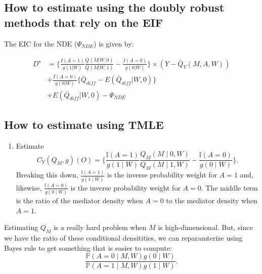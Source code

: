 \documentclass[
  12pt, krantz2,
]{book}
\providecommand{\tightlist}{%
  \setlength{\itemsep}{0pt}\setlength{\parskip}{0pt}}
\theoremstyle{definition}
\theoremstyle{definition}
\theoremstyle{definition}
\renewcommand{\P}{\mathbb{P}}
\newcommand{\I}{\mathbb{I}}
\newcommand{\1}{\mathbbm{1}}
\begin{document}
\hypertarget{how-to-estimate-using-the-doubly-robust-methods-that-rely-on-the-eif}{%
\subsection{How to estimate using the doubly robust methods that rely on the EIF}\label{how-to-estimate-using-the-doubly-robust-methods-that-rely-on-the-eif}}

The EIC for the NDE (\(\Psi_{NDE}\)) is given by:

\begin{align}
    D^{\star} &= \bigg\{ \frac{I(A=1)}{g(1|W)}\frac{Q(M|W,0)}{Q(M|W,1)} -
      \frac{I(A=0)}{g(0|W)}\bigg\} \times (Y-\bar{Q}_Y(M,A,W))  \\
    &+ \frac{I(A=0)}{g(0|W)}\{ \bar{Q}_{diff} - E(\bar{Q}_{diff} | W,0) \}\\
    &+ E(\bar{Q}_{diff} | W,0) - \Psi_{NDE}
\end{align}

\hypertarget{how-to-estimate-using-tmle}{%
\subsection{How to estimate using TMLE}\label{how-to-estimate-using-tmle}}

\begin{enumerate}
\def\labelenumi{\arabic{enumi}.}
\tightlist
\item
  Estimate
  \begin{equation*}
   C_Y(Q_M, g)(O) = \Bigg\{\frac{\I(A = 1)}{g(1 \mid W)}
     \frac{Q_M(M \mid 0, W)}{Q_M(M \mid 1, W)} -
     \frac{\I(A = 0)}{g(0 \mid W)} \Bigg\}.
    \end{equation*}
  Breaking this down, \(\frac{\I(A = 1)}{g(1 \mid W)}\) is the inverse probability
  weight for \(A = 1\) and, likewise, \(\frac{\I(A = 0)}{g(0 \mid W)}\) is the inverse
  probability weight for \(A = 0\). The middle term is the ratio of the mediator
  density when \(A = 0\) to the mediator density when \(A = 1\).
\end{enumerate}

Estimating \(Q_M\) is a really hard problem when \(M\) is high-dimensional. But,
since we have the ratio of these conditional densitities, we can reparamterize
using Bayes rule to get something that is easier to compute:
\begin{equation*}
  \frac{\P(A = 0 \mid M, W) g(0 \mid W)}{\P(A = 1 \mid M, W) g(1 \mid W)}.
\end{equation*}
\end{document}
